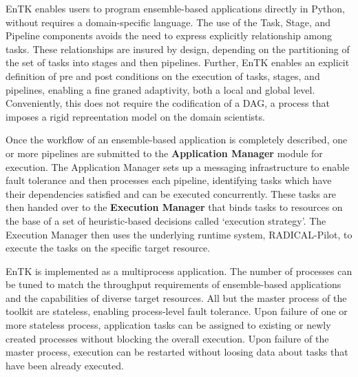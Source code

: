 EnTK enables users to program ensemble-based applications directly in Python,
without requires a domain-specific language. The use of the Task, Stage, and
Pipeline components avoids the need to express explicitly relationship among
tasks. These relationships are insured by design, depending on the
partitioning of the set of tasks into stages and then pipelines. Further,
EnTK enables an explicit definition of pre and post conditions on the
execution of tasks, stages, and pipelines, enabling a fine graned adaptivity,
both a local and global level. Conveniently, this does not require the
codification of a DAG, a process that imposes a rigid repreentation model on
the domain scientists.

Once the workflow of an ensemble-based application is completely described,
one or more pipelines are submitted to the \textbf{Application Manager}
module for execution. The Application Manager sets up a messaging
infrastructure to enable fault tolerance and then processes each pipeline,
identifying tasks which have their dependencies satisfied and can be executed
concurrently. These tasks are then handed over to the \textbf{Execution
Manager} that binds tasks to resources on the base of a set of
heuristic-based decisions called `execution strategy'. The Execution Manager
then uses the underlying runtime system, RADICAL-Pilot, to execute the tasks
on the specific target resource.

EnTK is implemented as a multiprocess application. The number of processes
can be tuned to match the throughput requirements of ensemble-based
applications and the capabilities of diverse target resources. All but the
master process of the toolkit are stateless, enabling process-level fault
tolerance. Upon failure of one or more stateless process, application tasks
can be assigned to existing or newly created processes without blocking the
overall execution. Upon failure of the master process, execution can be
restarted without loosing data about tasks that have been already executed.

